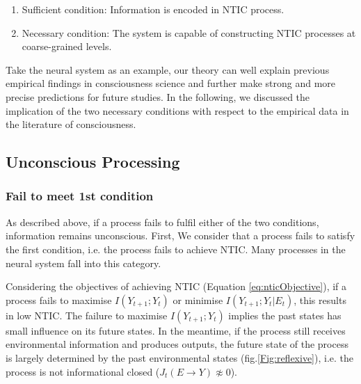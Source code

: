 \documentclass[utf8]{article}
\newcommand{\rlstart}[1]{  %
        \setlength\changebarwidth{#1pt*2}  %
        \hspace*{-40pt}
        \cbstart{\textcolor{red}{\newline\textbf{iteration #1}}\newline}}
\begin{document}
		\begin{enumerate}
		    \item Sufficient condition: Information is encoded in NTIC process. 
		    \item Necessary condition: The system is capable of constructing NTIC processes at coarse-grained levels. 
		\end{enumerate}		
		
		Take the neural system as an example, our theory can well explain previous empirical findings in consciousness science and further make strong and more precise predictions for future studies. In the following, we discussed the implication of the two necessary conditions with respect to the empirical data in the literature of consciousness. 
		
		\subsection{Unconscious Processing}
		

        \subsubsection{Fail to meet 1\lowercase{st} condition}
\rlstart{4}        	
            As described above, if a process fails to fulfil either of the two conditions, information remains unconscious. First, We consider that a process fails to satisfy the first condition, i.e. the process fails to achieve NTIC. Many processes in the neural system fall into this category. 
        	
        	Considering the objectives of achieving NTIC (Equation \ref{eq:nticObjective}), if a process fails to maximise $I(Y_{t+1};Y_{t})$ or minimise $I(Y_{t+1};Y_{t}|E_{t})$, this results in low NTIC. The failure to maximise $I(Y_{t+1};Y_{t})$ implies the past states has small influence on its future states. In the meantime, if the process still receives environmental information and produces outputs, the future state of the process is largely determined by the past environmental states (fig.\ref{Fig:reflexive}), i.e. the process is not informational closed (${J_{t}(E \rightarrow Y )} \not\approx 0$). 
        	
            
\end{document}
